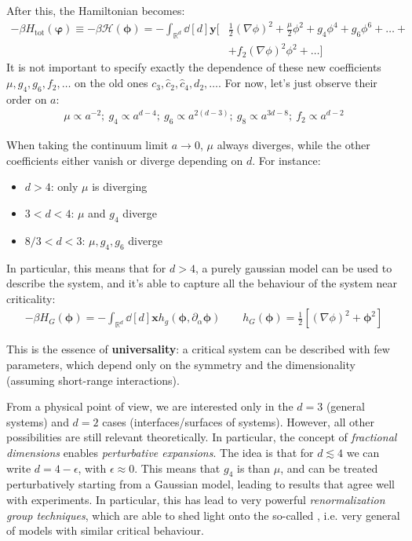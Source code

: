 \documentclass[../../main.tex]{subfiles}
\begin{document}
After this, the Hamiltonian becomes:
\begin{align}\label{eqn:continuum-limit}
    -\beta H_{\mathrm{tot}}(\bm{\varphi}) \equiv -\beta \mathcal{H}(\bm{\phi}) = - \int_{\mathbb{R}^d} \dd[d]{\bm{y}} \Big[&\frac{1}{2}(\nabla \phi)^2 + \frac{\mu}{2} \phi^2 + g_4 \phi^4 + g_6 \phi^6 + \dots +\\
    &+ f_2 (\nabla \phi)^2 \phi^2 + \dots \Big]
\end{align}
It is not important to specify exactly the dependence of these new coefficients $\mu, g_4, g_6, f_2, \dots$ on the old ones $c_3, \hat{c}_2, \hat{c}_4, d_2, \dots$. For now, let's just observe their order on $a$:
\begin{align*}
    \mu \propto a^{-2}; \> g_4 \propto a^{d-4}; \> g_6 \propto a^{2(d-3)}; \> g_8 \propto a^{3d-8}; \> f_2 \propto a^{d-2}
\end{align*}

When taking the continuum limit $a \to 0$, $\mu$ always diverges, while the other coefficients either vanish or diverge depending on $d$. For instance:
\begin{itemize}
    \item $d > 4$: only $\mu$ is diverging
    \item $3 < d < 4$: $\mu$ and $g_4$ diverge
    \item $8/3 < d < 3$: $\mu, g_4, g_6$ diverge
\end{itemize}
In particular, this means that for $d > 4$, a purely gaussian model can be used to describe the system, and it's able to capture all the behaviour of the system near criticality:
\begin{align*}
    -\beta H_G(\bm{\phi}) = - \int_{\mathbb{R}^d}\dd[d]{\bm{x}} h_g(\bm{\phi}, \partial_\alpha \bm{\phi}) \qquad h_G(\bm{\phi}) = \frac{1}{2}\left[(\nabla \phi)^2 + \bm{\phi}^2 \right] 
\end{align*}

This is the essence of \textbf{universality}: a critical system can be described with few parameters, which depend only on the symmetry and the dimensionality (assuming short-range interactions).   

\medskip

From a physical point of view, we are interested only in the $d=3$ (general systems) and $d=2$ cases (interfaces/surfaces of systems). However, all other possibilities are still relevant theoretically. In particular, the concept of \textit{fractional dimensions} enables \textit{perturbative expansions}. The idea is that for $d \lesssim 4$ we can write $d = 4 - \epsilon$, with $\epsilon \approx 0$. This means that $g_4$ is  than $\mu$, and can be treated perturbatively starting from a Gaussian model, leading to results that agree well with experiments. In particular, this has lead to very powerful \textit{renormalization group techniques}, which are able to shed light onto the so-called , i.e. very general  of models with similar critical behaviour.
\end{document}
